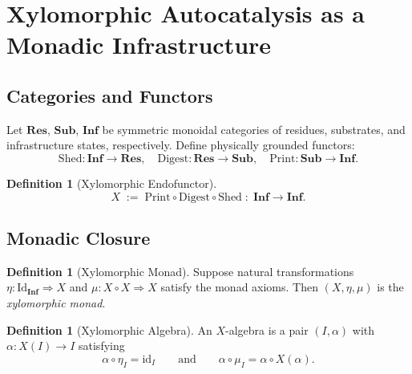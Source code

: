 \documentclass[11pt,a4paper]{article}
\theoremstyle{plain}
\theoremstyle{definition}
\newtheorem{definition}[theorem]{Definition}
\theoremstyle{remark}
\begin{document}
\section{Xylomorphic Autocatalysis as a Monadic Infrastructure}
\label{app:monad}

\subsection{Categories and Functors}

Let $\mathbf{Res}$, $\mathbf{Sub}$, $\mathbf{Inf}$ be symmetric monoidal
categories of residues, substrates, and infrastructure states, respectively.
Define physically grounded functors:
\[
  \mathrm{Shed} : \mathbf{Inf} \to \mathbf{Res}, \quad
  \mathrm{Digest} : \mathbf{Res} \to \mathbf{Sub}, \quad
  \mathrm{Print} : \mathbf{Sub} \to \mathbf{Inf}.
\]

\begin{definition}[Xylomorphic Endofunctor]
\[
  X \;:=\; \mathrm{Print} \circ \mathrm{Digest} \circ \mathrm{Shed}
  \;:\; \mathbf{Inf} \to \mathbf{Inf}.
\]
\end{definition}

\begin{center}
\end{center}

\subsection{Monadic Closure}

\begin{definition}[Xylomorphic Monad]
Suppose natural transformations $\eta : \mathrm{Id}_{\mathbf{Inf}} \Rightarrow X$
and $\mu : X \circ X \Rightarrow X$ satisfy the monad axioms. Then
$(X, \eta, \mu)$ is the \emph{xylomorphic monad}.
\end{definition}

\begin{definition}[Xylomorphic Algebra]
An $X$-algebra is a pair $(I, \alpha)$ with $\alpha : X(I) \to I$ satisfying
\[
  \alpha \circ \eta_I = \mathrm{id}_I
  \qquad\text{and}\qquad
  \alpha \circ \mu_I = \alpha \circ X(\alpha).
\]
\end{definition}
\end{document}
